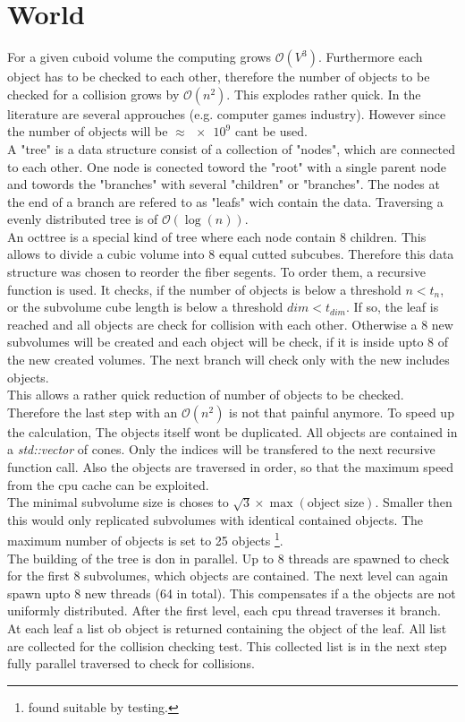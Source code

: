 \section{World}
For a given cuboid volume the computing grows $\mathcal{O}(V^3)$. Furthermore each object has to be checked to each other, therefore the number of objects to be checked for a collision grows by $\mathcal{O}(n^2)$. This explodes rather quick. In the literature are several approuches (e.g. computer games industry). However since the number of objects will be $\approx \num{e9}$ \dummy cant be used. \\
% 
A "tree" is a data structure consist of a collection of "nodes", which are connected to each other. One node is conected toword the "root" with a single parent node and towords the "branches" with several "children" or "branches". The nodes at the end of a branch are refered to as "leafs" wich contain the data. Traversing a  evenly distributed tree is of $\mathcal{O}(\log(n))$.\\
% 
An octtree is a special kind of tree where each node contain 8 children. This allows to divide a cubic volume into 8 equal cutted subcubes. Therefore this data structure was chosen to reorder the fiber segents. To order them, a recursive function is used. It checks, if the number of objects is below a threshold $n < t_n$, or the subvolume cube length is below a threshold $dim < t_{dim}$. If so, the leaf is reached and all objects are check for collision with each other. Otherwise a 8 new subvolumes will be created and each object will be check, if it is inside upto 8 of the new created volumes. The next branch will check only with the new includes objects. \\
% 
This allows a rather quick reduction of number of objects to be checked. Therefore the last step with an $\mathcal{O}(n^2)$ is not that painful anymore. To speed up the calculation, The objects itself wont be duplicated. All objects are contained in a \textit{std::vector} of cones. Only the indices will be transfered to the next recursive function call. Also the objects are traversed in order, so that the maximum speed from the cpu cache can be exploited. \\
% 
The minimal subvolume size is choses to $\sqrt{3} \times \max(\text{object size})$. Smaller then this would only replicated subvolumes with identical contained objects.
The maximum number of objects is set to \num{25} objects \footnote{found suitable by testing.}. \\
% 
The building of the tree is don in parallel. Up to 8 threads are spawned to check for the first 8 subvolumes, which objects are contained. The next level can again spawn upto 8 new threads (64 in total). This compensates if a the objects are not uniformly distributed. After the first level, each cpu thread traverses it branch. At each leaf a list ob object is returned containing the object of the leaf. All list are collected for the collision checking test. This collected list is in the next step fully parallel traversed to check for collisions.
% 
